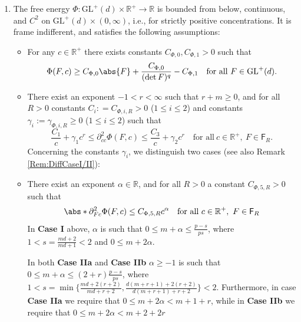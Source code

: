 \documentclass[a4paper,12pt]{article}
\newcommand{\R}{\mathbb{R}}
\newcommand{\pl}{\partial}
\newcommand{\GL}{\mathrm{GL}}
\theoremstyle{plain}
\theoremstyle{definition}
\numberwithin{equation}{section}
\begin{document}
\begin{enumerate}[label=\emph{\bfseries (A\arabic*)}]
\item \label{Assu:FreeEn} The free energy $\Phi: \GL^+(d)\times\R^+ \to \R$ is bounded from below, continuous, and $C^2$ on $\GL^+(d)\times (0,\infty)$, i.e., for strictly positive concentrations. It is frame indifferent, and satisfies the following assumptions:
\begin{itemize}
    \item[(i)] For any $c\in \R^+$ there exists constants $C_{\Phi,0}, C_{\Phi,1}>0$ such that
    \begin{equation*}
\Phi(F,c) \geq C_{\Phi,0}\abs{F} + \frac{C_{\Phi,0}}{(\det F)^q}-C_{\Phi,1}\quad \text{for all}\ F\in \GL^+(d).
\end{equation*}
	\item[(ii)] There exist an exponent $-1<r<\infty$ such that $r+m\geq 0$, and for all $R>0$ constants $C_i: = C_{\Phi,i,R}>0$ ($1\leq i\leq 2$) and constants $\gamma_i := \gamma_{\Phi,i,R}\geq 0$ ($1\leq i\leq 2$) such that 
	\[
	\frac{C_1}{c} + \gamma_1c^r \leq \pl^2_{cc}\Phi(F,c) \leq \frac{C_3}{c} + \gamma_2c^r \quad \text{for all}\ c\in \R^+,~F\in \mathsf{F}_R.
	\]
	Concerning the constants $\gamma_i$, we distinguish two cases (see also Remark \ref{Rem:DiffCaseI/II}): 

	\item[(iii)] There exist an exponent $\alpha\in \R$, and for all $R>0$ a constant $C_{\Phi,5,R}>0$ such that 
	\[
	\abs*{\pl^2_{Fc}\Phi(F,c)}\leq C_{\Phi,5,R}c^\alpha \quad \text{for all}\ c\in \R^+,~ F\in\mathsf{F}_R
	\]
	   In \textbf{Case I} above, 
        $\alpha$ is such that $0\leq m+\alpha \leq \frac{p-s}{ps}$, where $1<s=\frac{md+2}{md+1}< 2$ and $0\leq m+2\alpha$.

    In both \textbf{Case IIa} and \textbf{Case IIb} $\alpha\geq -1$ is such that $0\leq m+\alpha \leq (2+r)\frac{p-s}{ps}$, where $1<s=\min\{\frac{md+2(r+2)}{md+r+2},\frac{d(m+r+1)+2(r+2)}{d(m+r+1)+r+2}\}<2$. Furthermore, in case \textbf{Case IIa} we require that $0\leq m+2\alpha <m+1+r$, while in \textbf{Case IIb} we require that $0\leq m+2\alpha <m+2+2r$
 

\end{itemize}
\end{enumerate}
\end{document}
